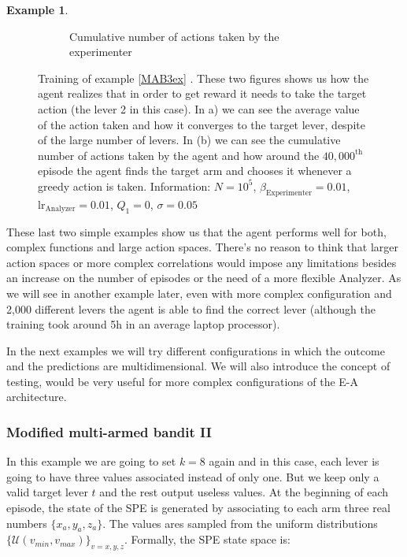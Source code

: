 \documentclass[11pt,a4paper,twoside]{report}
\newcommand{\+}{\textnormal{+} }
\theoremstyle{definition}
\newtheorem{myex}[mythm]{Example}
\numberwithin{equation}{chapter}
\begin{document}
\begin{myex}
\begin{figure}[]
\begin{subfigure}{.5\textwidth}
        \caption{Cumulative number of actions taken by the experimenter}
        \label{fig:actionsMAB3}
      \end{subfigure}
      \caption{Training of example \ref{MAB3ex} . These two figures shows us how
      the agent realizes that in order to get reward it needs to take the target
      action (the lever 2 in this case). In a) we can see the average value of
      the action taken and how it converges to the target lever, despite of the
      large number of levers. In (b) we can
      see the cumulative number of actions taken by the agent and how around the
      $40,000^\text{th}$ episode the agent finds the target arm and chooses it
      whenever a greedy action is taken. Information: $N=10^5$,
      $\beta_\text{Experimenter}=0.01$, $\text{lr}_\text{Analyzer}=0.01$,
      $Q_1=0$, $\sigma=0.05$}
    \end{figure}
  \end{myex}

  These last two simple examples show us that the agent performs well for both, 
  complex functions and large action spaces. There's no reason to think that 
  larger action spaces or more complex correlations would impose any 
  limitations besides an increase on the number of episodes or the need of a
  more flexible Analyzer. As we will see in another example later, even 
  with more complex configuration and 2,000 different levers the agent is able
  to find the correct lever (although the training took around 5h in an
  average laptop processor).

  \par In the next examples we will try different configurations in which the
  outcome and the predictions are multidimensional. We will also introduce the 
  concept of testing, would be very useful for more complex configurations of 
  the E-A architecture.

  \subsubsection{Modified multi-armed bandit II}
    In this example we are going to set $k=8$ again and in this case, each
    lever is going to have three values associated instead of only one. But 
    we keep only a valid target lever $t$ and the rest output useless
    values. At the beginning of each episode, the
    state of the SPE is generated by associating to each arm three real numbers
     $\{x_a,y_a,z_a\}$. The values ares sampled from the uniform distributions
    $\{\mathcal{U}(v_{min},v_{max})\}_{v=x,y,z}$. Formally, the SPE state space 
    is:
    
\end{document}

